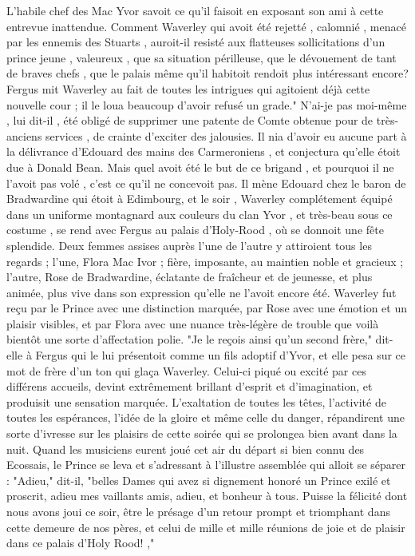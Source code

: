 L'habile chef des Mac Yvor savoit ce qu'il faisoit en exposant son ami à cette entrevue inattendue. Comment Waverley qui avoit été rejetté , calomnié , menacé par les ennemis des Stuarts , auroit-il resisté aux flatteuses sollicitations d'un prince jeune , valeureux , que sa situation périlleuse, que le dévouement de tant de braves chefs , que le palais même qu'il habitoit rendoit plus intéressant encore? Fergus mit Waverley au fait de toutes les intrigues qui agitoient déjà cette nouvelle cour ; il le loua beaucoup d'avoir refusé un grade." N'ai-je pas moi-même , lui dit-il , été obligé de supprimer une patente de Comte obtenue pour de très-anciens services , de crainte d'exciter des jalousies. Il nia d'avoir eu aucune part à la délivrance d'Edouard des mains des Carmeroniens , et conjectura qu'elle étoit due à Donald Bean. Mais quel avoit été le but de ce brigand , et pourquoi il ne l'avoit pas volé , c'est ce qu'il ne concevoit pas. Il mène Edouard chez le baron de Bradwardine qui étoit à Edimbourg, et le soir , Waverley complétement équipé dans un uniforme montagnard aux couleurs du clan Yvor , et très-beau sous ce costume , se rend avec Fergus au palais d'Holy-Rood , où se donnoit une fête splendide.\setcounter{page}{230} Deux femmes assises auprès l'une de l'autre y attiroient tous les regards ; l'une, Flora Mac Ivor ; fière, imposante, au maintien noble et gracieux ; l'autre, Rose de Bradwardine, éclatante de fraîcheur et de jeunesse, et plus animée, plus vive dans son expression qu'elle ne l'avoit encore été. Waverley fut reçu par le Prince avec une distinction marquée, par Rose avec une émotion et un plaisir visibles, et par Flora avec une nuance très-légère de trouble que voilà bientôt une sorte d'affectation polie. "Je le reçois ainsi qu'un second frère," dit-elle à Fergus qui le lui présentoit comme un fils adoptif d'Yvor, et elle pesa sur ce mot de frère d'un ton qui glaça Waverley. Celui-ci piqué ou excité par ces différens accueils, devint extrêmement brillant d'esprit et d'imagination, et produisit une sensation marquée. L'exaltation de toutes les têtes, l'activité de toutes les espérances, l'idée de la gloire et même celle du danger, répandirent une sorte d'ivresse sur les plaisirs de cette soirée qui se prolongea bien avant dans la nuit. Quand les musiciens eurent joué cet air du départ si bien connu des Ecossais, le Prince se leva et s'adressant à l'illustre assemblée qui alloit se séparer : "Adieu," dit-il, "belles Dames qui avez si dignement honoré un Prince\setcounter{page}{231} exilé et proscrit, adieu mes vaillants amis, adieu, et bonheur à tous. Puisse la félicité dont nous avons joui ce soir, être le présage d'un retour prompt et triomphant dans cette demeure de nos pères, et celui de mille et mille réunions de joie et de plaisir dans ce palais d'Holy Rood! ,"
